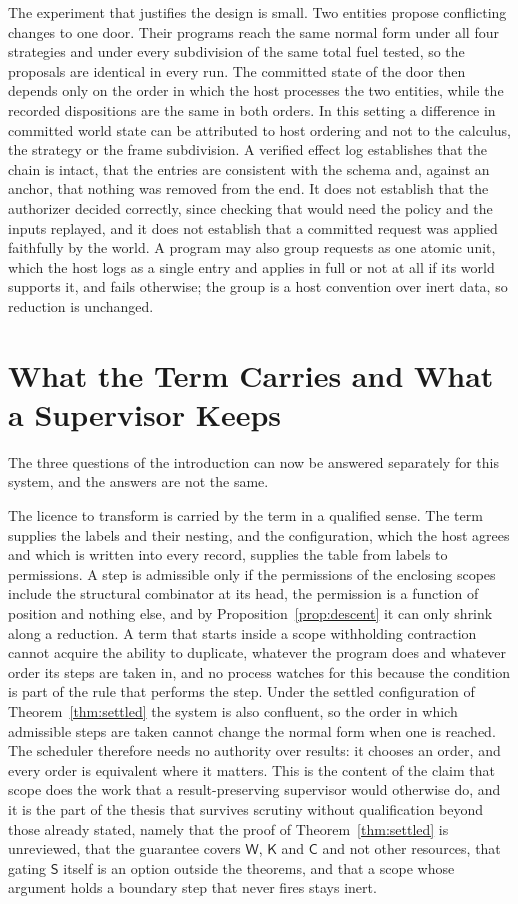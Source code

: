 \documentclass[11pt]{article}
\theoremstyle{definition}
\theoremstyle{remark}
\newcommand{\cC}{\mathsf{C}}
\newcommand{\cK}{\mathsf{K}}
\newcommand{\cW}{\mathsf{W}}
\newcommand{\cS}{\mathsf{S}}
\begin{document}
The experiment that justifies the design is small. Two entities propose conflicting changes to one door. Their programs reach the same normal form under all four strategies and under every subdivision of the same total fuel tested, so the proposals are identical in every run. The committed state of the door then depends only on the order in which the host processes the two entities, while the recorded dispositions are the same in both orders. In this setting a difference in committed world state can be attributed to host ordering and not to the calculus, the strategy or the frame subdivision. A verified effect log establishes that the chain is intact, that the entries are consistent with the schema and, against an anchor, that nothing was removed from the end. It does not establish that the authorizer decided correctly, since checking that would need the policy and the inputs replayed, and it does not establish that a committed request was applied faithfully by the world. A program may also group requests as one atomic unit, which the host logs as a single entry and applies in full or not at all if its world supports it, and fails otherwise; the group is a host convention over inert data, so reduction is unchanged.


\section{What the Term Carries and What a Supervisor Keeps}\label{sec:carried}

The three questions of the introduction can now be answered separately for this system, and the answers are not the same.

The licence to transform is carried by the term in a qualified sense. The term supplies the labels and their nesting, and the configuration, which the host agrees and which is written into every record, supplies the table from labels to permissions. A step is admissible only if the permissions of the enclosing scopes include the structural combinator at its head, the permission is a function of position and nothing else, and by Proposition~\ref{prop:descent} it can only shrink along a reduction. A term that starts inside a scope withholding contraction cannot acquire the ability to duplicate, whatever the program does and whatever order its steps are taken in, and no process watches for this because the condition is part of the rule that performs the step. Under the settled configuration of Theorem~\ref{thm:settled} the system is also confluent, so the order in which admissible steps are taken cannot change the normal form when one is reached. The scheduler therefore needs no authority over results: it chooses an order, and every order is equivalent where it matters. This is the content of the claim that scope does the work that a result-preserving supervisor would otherwise do, and it is the part of the thesis that survives scrutiny without qualification beyond those already stated, namely that the proof of Theorem~\ref{thm:settled} is unreviewed, that the guarantee covers $\cW$, $\cK$ and $\cC$ and not other resources, that gating $\cS$ itself is an option outside the theorems, and that a scope whose argument holds a boundary step that never fires stays inert.
\end{document}
